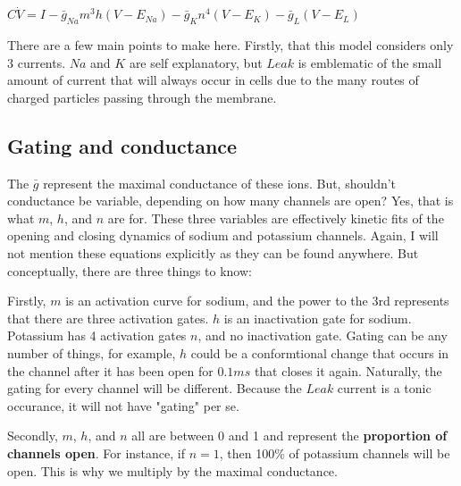 \documentclass[12pt]{amsart}
\begin{document}
\bigskip

\begin{center}

    $C\dot{V} = I - \bar{g}_{Na}m^3h(V - E_{Na}) - \bar{g}_{K}n^4(V - E_{K}) - \bar{g}_{L}(V - E_{L})$
    
\end{center}

\bigskip 

There are a few main points to make here. Firstly, that this model considers only 3 currents. $Na$ and $K$ are self explanatory, but $Leak$ is emblematic of the small amount of current that will always occur in cells due to the many routes of charged particles passing through the membrane.\newline

\subsection{Gating and conductance} The $\bar{g}$ represent the maximal conductance of these ions. But, shouldn't conductance be variable, depending on how many channels are open? Yes, that is what $m$, $h$, and $n$ are for. These three variables are effectively kinetic fits of the opening and closing dynamics of sodium and potassium channels. Again, I will not mention these equations explicitly as they can be found anywhere. But conceptually, there are three things to know:\newline

Firstly, $m$ is an activation curve for sodium, and the power to the 3rd represents that there are three activation gates. $h$ is an inactivation gate for sodium. Potassium has 4 activation gates $n$, and no inactivation gate. Gating can be any number of things, for example, $h$ could be a conformtional change that occurs in the channel after it has been open for $0.1 ms$ that closes it again. Naturally, the gating for every channel will be different. Because the $Leak$ current is a tonic occurance, it will not have "gating" per se.\newline

Secondly, $m$, $h$, and $n$ all are between 0 and 1 and represent the \textbf{proportion of channels open}. For instance, if $n = 1$, then 100\% of potassium channels will be open. This is why we multiply by the maximal conductance.\newline
\end{document}

